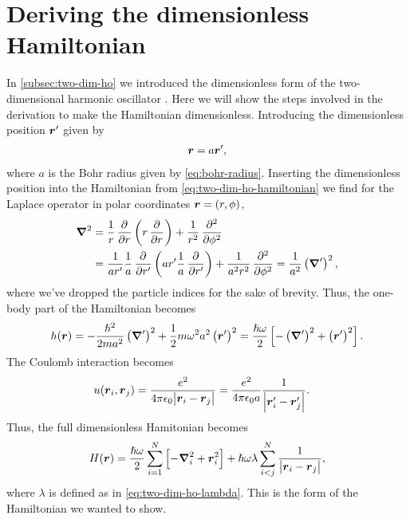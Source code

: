     \section{Deriving the dimensionless Hamiltonian}
        \label{app:two-dim-ho-dimensionless}
        In \autoref{subsec:two-dim-ho} we introduced the dimensionless form of
        the two-dimensional harmonic oscillator \cite{anisimovas1998energy}.
        Here we will show the steps involved in the derivation to make the
        Hamiltonian dimensionless.
        Introducing the dimensionless position $\boldsymbol{r}'$ given by
        \begin{align}
            \boldsymbol{r} = a \boldsymbol{r}',
        \end{align}
        where $a$ is the Bohr radius given by \autoref{eq:bohr-radius}.
        Inserting the dimensionless position into the Hamiltonian from
        \autoref{eq:two-dim-ho-hamiltonian} we find for the Laplace operator in
        polar coordinates $\boldsymbol{r} = (r, \phi)$,
        \begin{align}
            \vfg{\nabla}^2
            &= \frac{1}{r}\dpd{}{r}\para{
                r\dpd{}{r}
            }
            + \frac{1}{r^2}\dpd[2]{}{\phi}
            \\
            &= \frac{1}{a r'}\frac{1}{a}\dpd{}{r'}\para{
                a r' \frac{1}{a}\dpd{}{r'}
            }
            + \frac{1}{a^2 r^2}\dpd[2]{}{\phi}
            = \frac{1}{a^2}\para{\vfg{\nabla}'}^2,
        \end{align}
        where we've dropped the particle indices for the sake of brevity.
        Thus, the one-body part of the Hamiltonian becomes
        \begin{align}
            h(\boldsymbol{r})
            = -\frac{\hslash^2}{2m a^2}\left( \boldsymbol{\nabla}' \right)^2
            + \frac{1}{2} m \omega^2 a^2 \left( \boldsymbol{r}' \right)^2
            = \frac{\hslash\omega}{2}\left[ 
                -\left( \boldsymbol{\nabla}' \right)^2
                + \left( \boldsymbol{r}' \right)^2
             \right].
        \end{align}
        The Coulomb interaction becomes
        \begin{align}
            u(\boldsymbol{r}_i, \boldsymbol{r}_j)
            &= \frac{e^2}{4\pi\epsilon_0 \abs{\boldsymbol{r}_i - \boldsymbol{r}_j}}
            = \frac{e^2}{4\pi \epsilon_0 a}
            \frac{1}{\abs{\boldsymbol{r}_i' - \boldsymbol{r}_j'}}.
        \end{align}
        Thus, the full dimensionless Hamitonian becomes
        \begin{align}
            H(\boldsymbol{r})
            = \frac{\hslash\omega}{2} \sum_{i = 1}^{N}\left[ 
                -\boldsymbol{\nabla}^2_i
                + \boldsymbol{r}^2_i
             \right]
            + \hslash \omega \lambda
            \sum_{i < j}^{N} \frac{1}{\abs{\boldsymbol{r}_i - \boldsymbol{r}_j}},
        \end{align}
        where $\lambda$ is defined as in \autoref{eq:two-dim-ho-lambda}.
        This is the form of the Hamiltonian we wanted to show.

